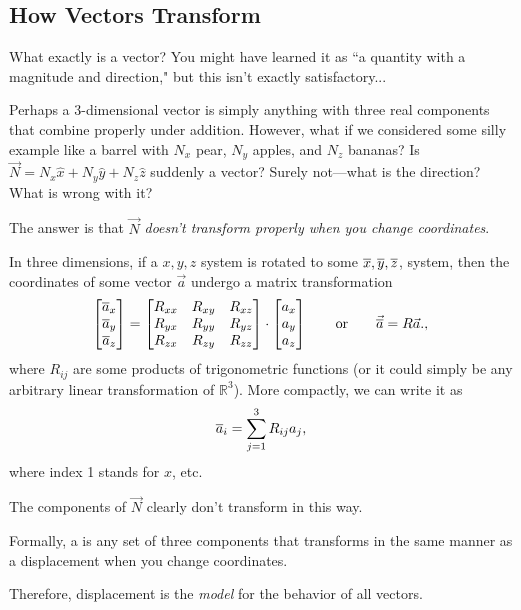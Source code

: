 \subsection{How Vectors Transform}

What exactly is a vector? You might have learned it as ``a quantity with a magnitude and direction," but this isn't exactly satisfactory...

Perhaps a 3-dimensional vector is simply anything with three real components that combine properly under addition. However, what if we considered some silly example like a barrel with $N_x$ pear, $N_y$ apples, and $N_z$ bananas? Is $\vec{N}=N_x\hat{x}+N_y\hat{y}+N_z\hat{z}$ suddenly a vector? Surely not---what is the direction? What is wrong with it?

The answer is that $\vec{N}$ \textit{doesn't transform properly when you change coordinates}.

In three dimensions, if a $x,y,z$ system is rotated to some $\overline{x},\overline{y},\overline{z}$, system, then the coordinates of some vector $\vec{a}$ undergo a matrix transformation
\[
\begin{bmatrix}
\overline{a}_x\\\overline{a}_y\\\overline{a}_z
\end{bmatrix}=\begin{bmatrix}
R_{xx} & R_{xy} & R_{xz}\\
R_{yx} & R_{yy} & R_{yz}\\
R_{zx} & R_{zy} & R_{zz}
\end{bmatrix}\cdot\begin{bmatrix}
a_x\\a_y\\a_z
\end{bmatrix}\qquad\text{or}\qquad \vec{\overline{a}}=R\vec{a}.,
\]
where $R_{ij}$ are some products of trigonometric functions (or it could simply be any arbitrary linear transformation of $\mathbb{R}^3$). More compactly, we can write it as
\[\overline{a}_i=\sum_{j=1}^3 R_{ij}a_j,\]
where index 1 stands for $x$, etc. 

The components of $\vec{N}$ clearly don't transform in this way.

\begin{definition}
Formally, a  is any set of three components that transforms in the same manner as a displacement when you change coordinates.
\end{definition}

Therefore, displacement is the \textit{model} for the behavior of all vectors.

